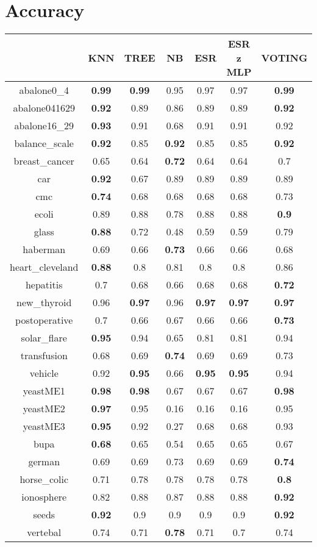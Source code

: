 \documentclass{article}%
\begin{document}
%
\normalsize%
\section*{Accuracy}%
\begin{tabular}{c|cccccc}%
\hline%
&KNN&TREE&NB&ESR&ESR z MLP&VOTING\\%
\hline%
abalone0\_4&\textbf{0.99}&\textbf{0.99}&0.95&0.97&0.97&\textbf{0.99}\\%
\hline%
abalone041629&\textbf{0.92}&0.89&0.86&0.89&0.89&\textbf{0.92}\\%
\hline%
abalone16\_29&\textbf{0.93}&0.91&0.68&0.91&0.91&0.92\\%
\hline%
balance\_scale&\textbf{0.92}&0.85&\textbf{0.92}&0.85&0.85&\textbf{0.92}\\%
\hline%
breast\_cancer&0.65&0.64&\textbf{0.72}&0.64&0.64&0.7\\%
\hline%
car&\textbf{0.92}&0.67&0.89&0.89&0.89&0.89\\%
\hline%
cmc&\textbf{0.74}&0.68&0.68&0.68&0.68&0.73\\%
\hline%
ecoli&0.89&0.88&0.78&0.88&0.88&\textbf{0.9}\\%
\hline%
glass&\textbf{0.88}&0.72&0.48&0.59&0.59&0.79\\%
\hline%
haberman&0.69&0.66&\textbf{0.73}&0.66&0.66&0.68\\%
\hline%
heart\_cleveland&\textbf{0.88}&0.8&0.81&0.8&0.8&0.86\\%
\hline%
hepatitis&0.7&0.68&0.66&0.68&0.68&\textbf{0.72}\\%
\hline%
new\_thyroid&0.96&\textbf{0.97}&0.96&\textbf{0.97}&\textbf{0.97}&\textbf{0.97}\\%
\hline%
postoperative&0.7&0.66&0.67&0.66&0.66&\textbf{0.73}\\%
\hline%
solar\_flare&\textbf{0.95}&0.94&0.65&0.81&0.81&0.94\\%
\hline%
transfusion&0.68&0.69&\textbf{0.74}&0.69&0.69&0.73\\%
\hline%
vehicle&0.92&\textbf{0.95}&0.66&\textbf{0.95}&\textbf{0.95}&0.94\\%
\hline%
yeastME1&\textbf{0.98}&\textbf{0.98}&0.67&0.67&0.67&\textbf{0.98}\\%
\hline%
yeastME2&\textbf{0.97}&0.95&0.16&0.16&0.16&0.95\\%
\hline%
yeastME3&\textbf{0.95}&0.92&0.27&0.68&0.68&0.93\\%
\hline%
bupa&\textbf{0.68}&0.65&0.54&0.65&0.65&0.67\\%
\hline%
german&0.69&0.69&0.73&0.69&0.69&\textbf{0.74}\\%
\hline%
horse\_colic&0.71&0.78&0.78&0.78&0.78&\textbf{0.8}\\%
\hline%
ionosphere&0.82&0.88&0.87&0.88&0.88&\textbf{0.92}\\%
\hline%
seeds&\textbf{0.92}&0.9&0.9&0.9&0.9&\textbf{0.92}\\%
\hline%
vertebal&0.74&0.71&\textbf{0.78}&0.71&0.7&0.74\\%
\hline%
\end{tabular}
\end{document}
